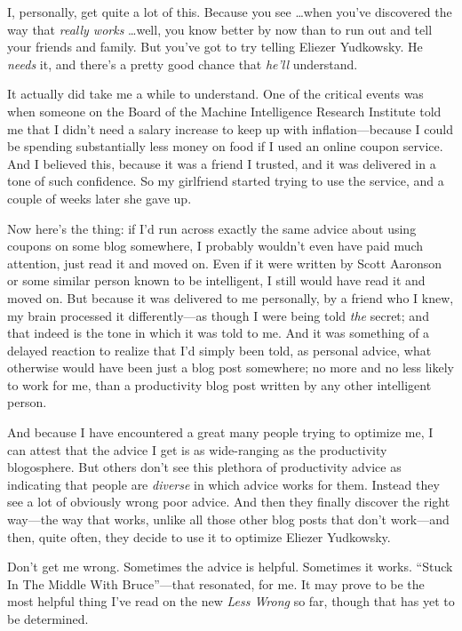 {
 I, personally, get quite a lot of this. Because you see \ldots when
you've discovered the way that \textit{really works}
\ldots well, you know better by now than to run out and tell your
friends and family. But you've got to try telling
Eliezer Yudkowsky. He \textit{needs} it, and there's a
pretty good chance that \textit{he'll} understand.}

{
 It actually did take me a while to understand. One of the critical
events was when someone on the Board of the Machine Intelligence
Research Institute told me that I didn't need a salary
increase to keep up with inflation---because I could be spending
substantially less money on food if I used an online coupon service.
And I believed this, because it was a friend I trusted, and it was
delivered in a tone of such confidence. So my girlfriend started trying
to use the service, and a couple of weeks later she gave up.}

{
 Now here's the thing: if I'd run
across exactly the same advice about using coupons on some blog
somewhere, I probably wouldn't even have paid much
attention, just read it and moved on. Even if it were written by Scott
Aaronson or some similar person known to be intelligent, I still would
have read it and moved on. But because it was delivered to me
personally, by a friend who I knew, my brain processed it
differently---as though I were being told \textit{the} secret; and that
indeed is the tone in which it was told to me. And it was something of
a delayed reaction to realize that I'd simply been
told, as personal advice, what otherwise would have been just a blog
post somewhere; no more and no less likely to work for me, than a
productivity blog post written by any other intelligent person.}

{
 And because I have encountered a great many people trying to
optimize me, I can attest that the advice I get is as wide-ranging as
the productivity blogosphere. But others don't see this
plethora of productivity advice as indicating that people are
\textit{diverse} in which advice works for them. Instead they see a lot
of obviously wrong poor advice. And then they finally discover the
right way---the way that works, unlike all those other blog posts that
don't work---and then, quite often, they decide to use
it to optimize Eliezer Yudkowsky.}

{
 Don't get me wrong. Sometimes the advice is
helpful. Sometimes it works. ``Stuck In The Middle
With Bruce''{}---that resonated, for me. It may prove
to be the most helpful thing I've read on the new
\textit{Less Wrong} so far, though that has yet to be determined.}

